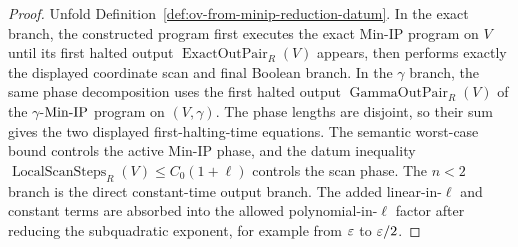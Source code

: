 \begin{proof}
  Unfold Definition~\ref{def:ov-from-minip-reduction-datum}.  In the exact
  branch, the constructed program first executes the exact Min-IP program on
  $V$ until its first halted output
  $\operatorname{ExactOutPair}_R(V)$ appears, then performs exactly the
  displayed coordinate scan and final Boolean branch.  In the $\gamma$ branch,
  the same phase decomposition uses the first halted output
  $\operatorname{GammaOutPair}_R(V)$ of the $\gamma$-$\mathrm{Min\mbox{-}IP}$ program on
  $(V,\gamma)$.  The phase lengths are disjoint, so their sum gives the two
  displayed first-halting-time equations.  The semantic worst-case bound
  controls the active Min-IP phase, and the datum inequality
  $\operatorname{LocalScanSteps}_R(V)\leq C_0(1+\ell)$ controls the scan phase.
  The $n<2$ branch is the direct constant-time output branch.  The added
  linear-in-$\ell$ and constant terms are absorbed into the allowed
  polynomial-in-$\ell$ factor after reducing the subquadratic exponent, for
  example from $\varepsilon$ to $\varepsilon/2$.
\end{proof}

